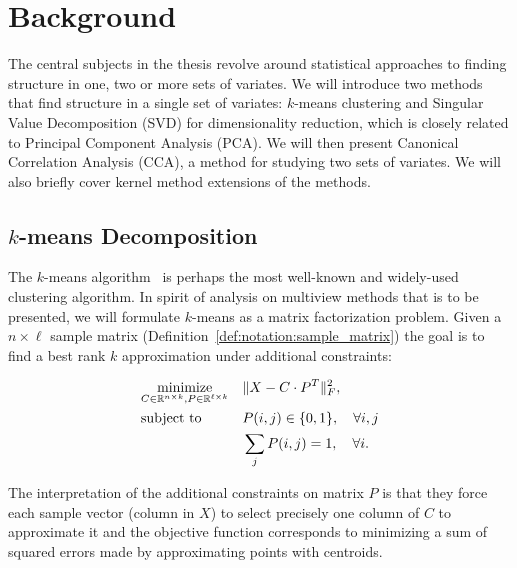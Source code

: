 %
\chapter{Background}\label{chap:background}

The central subjects in the thesis revolve around statistical approaches to finding structure in one, two or more sets of variates. We will
introduce two methods that find structure in a single set of variates: $k$-means clustering and Singular Value Decomposition (SVD) for dimensionality reduction, which is closely related to Principal Component Analysis (PCA). We will then present Canonical Correlation Analysis (CCA), a method for studying two sets of variates. We will also briefly cover kernel method extensions of the methods.


\section{$k$-means Decomposition}\label{chap:background:kmeans}

The $k$-means algorithm~\cite{kmeans} is perhaps the most well-known and widely-used clustering algorithm. In spirit of analysis on multiview methods that is to be presented, we will formulate $k$-means as a matrix factorization problem. Given a $n \times \ell$ sample matrix (Definition~\ref{def:notation:sample_matrix})
the goal is to find a best rank $k$ approximation under additional constraints:

\begin{equation}\label{eq:background:kmeans:opt}
\begin{aligned}
& \underset{C \in \mathbb{R}^{n \times k}, P \in \mathbb{R}^{\ell \times k}}{\text{minimize}}
& & \lVert X - C \cdot P^T\rVert_F^2, \\
& \text{subject to}
& & P(i,j) \in \{0,1\}, \quad \forall i,j \\
& & & \sum_j P(i, j) = 1, \quad \forall i.
\end{aligned}
\end{equation}

The interpretation of the additional constraints on matrix $P$ is that they force each sample vector
(column in $X$) to select precisely one column of $C$ to approximate it and the objective function
corresponds to minimizing a sum of squared errors made by approximating points with centroids.

